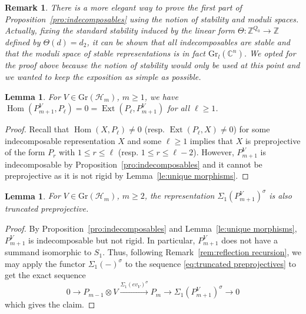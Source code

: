 \documentclass{amsart}
\newtheorem{lemma}[theorem]{Lemma}
\newtheorem{remark}[theorem]{Remark}
\numberwithin{equation}{section}
\newcommand{\CC}{\mathbb{C}}
\newcommand{\ZZ}{\mathbb{Z}}
\newcommand{\cH}{\mathcal{H}}
\newcommand\udim{{\underline{\dim}\, }}
\newcommand{\Ext}{\operatorname{Ext}}
\newcommand{\Gr}{\mathrm{Gr}}
\newcommand{\Hom}{\operatorname{Hom}}
\begin{document}
\begin{remark}
  There is a more elegant way to prove the first part of Proposition~\ref{pro:indecomposables} using the notion of stability and moduli spaces.
  Actually, fixing the standard stability induced by the linear form $\Theta:\ZZ^{Q_0}\to\ZZ$ defined by $\Theta(d)=d_2$, it can be shown that all indecomposables are stable and that the moduli space of stable representations is in fact $\Gr_l(\CC^n)$.
  We opted for the proof above because the notion of stability would only be used at this point and we wanted to keep the exposition as simple as possible. 
\end{remark}

\begin{lemma}
  \label{le:basic homological properties}
  For $V\in\Gr(\cH_m)$, $m\ge1$, we have $\Hom(P_{m+1}^V,P_\ell)=0=\Ext(P_\ell,P_{m+1}^V)$ for all $\ell\ge1$.
\end{lemma}
\begin{proof}
  Recall that $\Hom(X,P_\ell)\ne0$ (resp. $\Ext(P_\ell,X)\ne0$) for some indecomposable representation $X$ and some $\ell\ge1$ implies that $X$ is preprojective of the form $P_r$ with $1\le r\le\ell$ (resp. $1\le r\le\ell-2$).
  However, $P_{m+1}^V$ is indecomposable by Proposition~\ref{pro:indecomposables} and it cannot be preprojective as it is not rigid by Lemma~\ref{le:unique morphisms}.
\end{proof}

\begin{lemma}
  \label{le:reflected truncated preprojectives}
  For $V\in\Gr(\cH_m)$, $m\ge2$, the representation $\Sigma_1(P_{m+1}^V)^\sigma$ is also truncated preprojective.
\end{lemma}
\begin{proof}
  By Proposition~\ref{pro:indecomposables} and Lemma~\ref{le:unique morphisms}, $P_{m+1}^V$ is indecomposable but not rigid.
  In particular, $P_{m+1}^V$ does not have a summand isomorphic to $S_1$.
  Thus, following Remark~\ref{rem:reflection recursion}, we may apply the functor $\Sigma_1(-)^\sigma$ to the sequence \eqref{eq:truncated preprojectives} to get the exact sequence
  \[0\longrightarrow P_{m-1}\otimes V\xrightarrow{\Sigma_1(ev_V)^\sigma} P_m\longrightarrow \Sigma_1(P_{m+1}^V)^\sigma\longrightarrow 0\]
  which gives the claim.
\end{proof}
\end{document}
